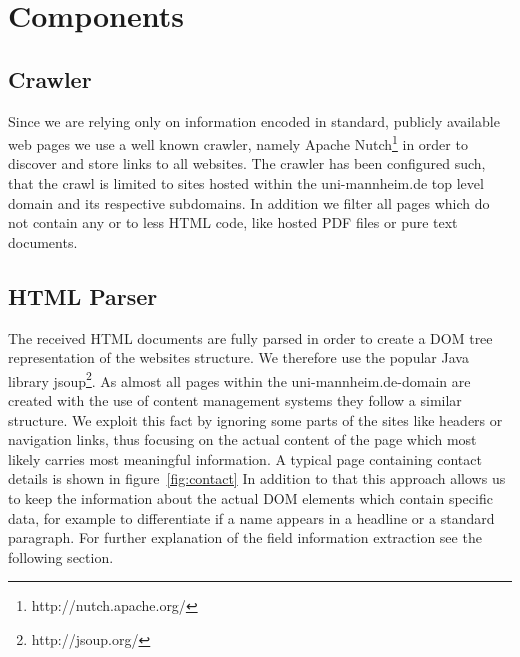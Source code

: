 \documentclass[11pt,titlepage,oneside,openany]{article}
\begin{document}
\section{Components}

\subsection{Crawler}
Since we are relying only on information encoded in standard, publicly available web pages we use a well known crawler, namely Apache Nutch\footnote{http://nutch.apache.org/} in order to discover and store links to all websites. The crawler has been configured such, that the crawl is limited to sites hosted within the uni-mannheim.de top level domain and its respective subdomains. In addition we filter all pages which do not contain any or to less HTML code, like hosted PDF files or pure text documents.

\subsection{HTML Parser}
The received HTML documents are fully parsed in order to create a DOM tree representation of the websites structure. We therefore use the popular Java library jsoup\footnote{http://jsoup.org/}. As almost all pages within the uni-mannheim.de-domain are created with the use of content management systems they follow a similar structure. We exploit this fact by ignoring some parts of the sites like headers or navigation links, thus focusing on the actual content of the page which most likely carries most meaningful information. A typical page containing contact details is shown in figure~\ref{fig:contact} In addition to that this approach allows us to keep the information about the actual DOM elements which contain specific data, for example to differentiate if a name appears in a headline or a standard paragraph. For further explanation of the field information extraction see the following section.
\end{document}
